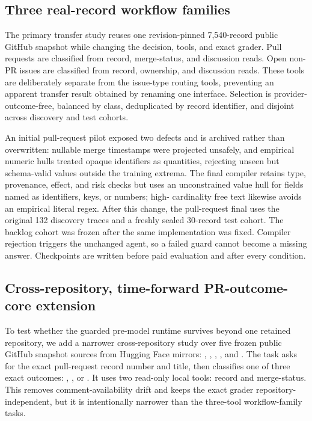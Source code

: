 \subsection{Three real-record workflow families}
\label{sec:github-families}

The primary transfer study reuses one revision-pinned 7,540-record public GitHub snapshot
while changing the decision, tools, and exact grader.  Pull requests are classified from
record, merge-status, and discussion reads.  Open non-PR issues are classified from
record, ownership, and discussion reads.  These tools are deliberately separate from the
issue-type routing tools, preventing an apparent transfer result obtained by renaming one
interface.  Selection is provider-outcome-free, balanced by class, deduplicated by record
identifier, and disjoint across discovery and test cohorts.

An initial pull-request pilot exposed two defects and is archived rather than overwritten:
nullable merge timestamps were projected unsafely, and empirical numeric hulls treated
opaque identifiers as quantities, rejecting unseen but schema-valid values outside the
training extrema.  The final compiler retains type, provenance, effect, and risk checks but
uses an unconstrained value hull for fields named as identifiers, keys, or numbers; high-
cardinality free text likewise avoids an empirical literal regex.  After this change, the
pull-request final uses the original 132 discovery traces and a freshly sealed 30-record
test cohort.  The backlog cohort was frozen after the same implementation was fixed.
Compiler rejection triggers the unchanged agent, so a failed guard cannot become a missing
answer.  Checkpoints are written before paid evaluation and after every condition.

\subsection{Cross-repository, time-forward PR-outcome-core extension}
\label{sec:multirepo-method}

To test whether the guarded pre-model runtime survives beyond one retained repository, we
add a narrower cross-repository study over five frozen public GitHub snapshot sources from
Hugging Face mirrors: , ,
, , and .  The task
asks for the exact pull-request record number and title, then classifies one of three
exact outcomes: , , or .  It uses two
read-only local tools: record and merge-status.  This removes comment-availability drift and keeps the exact
grader repository-independent, but it is intentionally narrower than the three-tool
workflow-family tasks.

